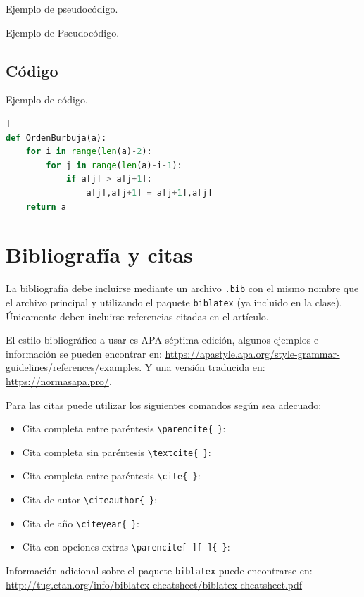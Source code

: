\documentclass{aleph-revista}
\begin{document}
Ejemplo de pseudocódigo.

\begin{algorithm}[H]
\caption{Ejemplo de Pseudocódigo.}
\end{algorithm}

\subsection{Código}

Ejemplo de código.

\begin{lstlisting}[language=Python,caption={Ejemplo de código.},captionpos=b]]
def OrdenBurbuja(a):
    for i in range(len(a)-2):
        for j in range(len(a)-i-1):
            if a[j] > a[j+1]:
                a[j],a[j+1] = a[j+1],a[j]
    return a
\end{lstlisting}

\section{Bibliografía y citas}

La bibliografía debe incluirse mediante un archivo \texttt{.bib} con el mismo nombre que el archivo principal y utilizando el paquete \texttt{biblatex} (ya incluido en la clase). Únicamente deben incluirse referencias citadas en el artículo.

El estilo bibliográfico a usar es APA séptima edición, algunos ejemplos e información se pueden encontrar en: \url{https://apastyle.apa.org/style-grammar-guidelines/references/examples}. Y una versión traducida en: \url{https://normasapa.pro/}.

Para las citas puede utilizar los siguientes comandos según sea adecuado:
\begin{itemize}
\item 
    Cita completa entre paréntesis \verb"\parencite{ }": \parencite{Bib06}
\item
    Cita completa sin paréntesis \verb"\textcite{ }": \textcite{Bib06}
\item 
    Cita completa entre paréntesis \verb"\cite{ }": \cite{Bib06}
\item
    Cita de autor \verb"\citeauthor{ }": \citeauthor{Bib06}
\item
    Cita de año \verb"\citeyear{ }": \citeyear{Bib06}
\item 
    Cita con opciones extras \verb"\parencite[ ][ ]{ }": \parencite[ver][pág. 66]{Bib06}
\end{itemize}
Información adicional sobre el paquete \texttt{biblatex} puede encontrarse en: \url{http://tug.ctan.org/info/biblatex-cheatsheet/biblatex-cheatsheet.pdf}
\end{document}
